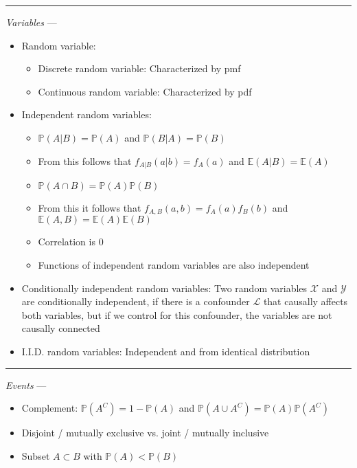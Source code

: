 {\color{lightgray}\hrule height 0.001mm}

\emph{Variables} --- 
\begin{itemize}
    \item Random variable:
    \begin{itemize}
        \item Discrete random variable: Characterized by pmf
        \item Continuous random variable: Characterized by pdf
    \end{itemize}
    \item Independent random variables:
    \begin{itemize}
        \item $\mathbb{P}(A|B) = \mathbb{P}(A)$ and $\mathbb{P}(B|A) = \mathbb{P}(B)$
        \item From this follows that $f_{A|B}(a|b) = f_A(a)$ and $\mathbb{E}(A|B) = \mathbb{E}(A)$ 
        \item $\mathbb{P}(A \cap B) = \mathbb{P}(A)\mathbb{P}(B)$
        \item From this it follows that $f_{A,B}(a,b) = f_A(a) f_B(b)$ and $\mathbb{E}(A,B) = \mathbb{E}(A)\mathbb{E}(B)$
        \item Correlation is 0 
        \item Functions of independent random variables are also independent
    \end{itemize}
    \item Conditionally independent random variables: Two random variables $\mathcal{X}$ and $\mathcal{Y}$ are conditionally independent, if there is a confounder $\mathcal{L}$ that causally affects both variables, but if we control for this confounder, the variables are not causally connected
    \item I.I.D. random variables: Independent and from identical distribution
\end{itemize}

{\color{lightgray}\hrule height 0.001mm}

\emph{Events} --- 
\begin{itemize}
    \item Complement: $\mathbb{P}(A^C) = 1 - \mathbb{P}(A)$ and $\mathbb{P}(A \cup A^C) = \mathbb{P}(A)\mathbb{P}(A^C)$
    \item Disjoint / mutually exclusive vs. joint / mutually inclusive
    \item Subset $A \subset B$ with $\mathbb{P}(A) < \mathbb{P}(B)$
\end{itemize}

